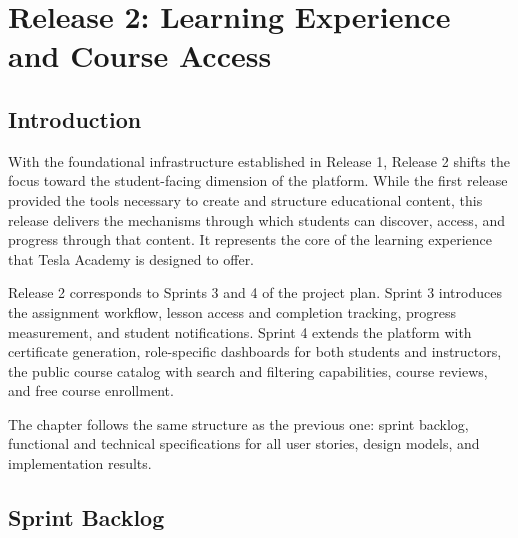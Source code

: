 \begingroup
\renewcommand{\baselinestretch}{0.85}
\chapter{Release 2: Learning Experience and Course Access}
\minitoc
\endgroup
\newpage

\section*{Introduction}

With the foundational infrastructure established in Release 1, Release 2 shifts the
focus toward the student-facing dimension of the platform. While the first release
provided the tools necessary to create and structure educational content, this release
delivers the mechanisms through which students can discover, access, and progress
through that content. It represents the core of the learning experience that Tesla
Academy is designed to offer.

Release 2 corresponds to Sprints 3 and 4 of the project plan. Sprint 3 introduces the
assignment workflow, lesson access and completion tracking, progress measurement, and
student notifications. Sprint 4 extends the platform with certificate generation,
role-specific dashboards for both students and instructors, the public course catalog
with search and filtering capabilities, course reviews, and free course enrollment.

The chapter follows the same structure as the previous one: sprint backlog, functional
and technical specifications for all user stories, design models, and implementation
results.

\section{Sprint Backlog}

